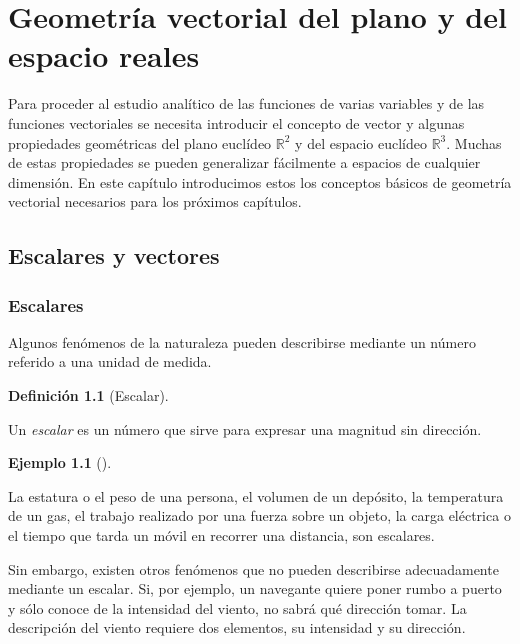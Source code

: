 \documentclass[
  a4paper,
]{scrreport}
\theoremstyle{definition}
\newtheorem{example}{Ejemplo}[chapter]
\theoremstyle{plain}
\theoremstyle{definition}
\newtheorem{definition}{Definición}[chapter]
\theoremstyle{definition}
\theoremstyle{plain}
\theoremstyle{plain}
\theoremstyle{remark}
\begin{document}

\chapter{Geometría vectorial del plano y del espacio
reales}\label{geometruxeda-vectorial-del-plano-y-del-espacio-reales}

Para proceder al estudio analítico de las funciones de varias variables
y de las funciones vectoriales se necesita introducir el concepto de
vector y algunas propiedades geométricas del plano euclídeo
\(\mathbb{R}^2\) y del espacio euclídeo \(\mathbb{R}^3\). Muchas de
estas propiedades se pueden generalizar fácilmente a espacios de
cualquier dimensión. En este capítulo introducimos estos los conceptos
básicos de geometría vectorial necesarios para los próximos capítulos.

\section{Escalares y vectores}\label{escalares-y-vectores}

\subsection{Escalares}\label{escalares}

Algunos fenómenos de la naturaleza pueden describirse mediante un número
referido a una unidad de medida.

\begin{definition}[Escalar]\protect\hypertarget{def-escalar}{}\label{def-escalar}

Un \emph{escalar} es un número que sirve para expresar una magnitud sin
dirección.

\end{definition}

\begin{example}[]\protect\hypertarget{exm-escalar}{}\label{exm-escalar}

La estatura o el peso de una persona, el volumen de un depósito, la
temperatura de un gas, el trabajo realizado por una fuerza sobre un
objeto, la carga eléctrica o el tiempo que tarda un móvil en recorrer
una distancia, son escalares.

\end{example}

Sin embargo, existen otros fenómenos que no pueden describirse
adecuadamente mediante un escalar. Si, por ejemplo, un navegante quiere
poner rumbo a puerto y sólo conoce de la intensidad del viento, no sabrá
qué dirección tomar. La descripción del viento requiere dos elementos,
su intensidad y su dirección.
\end{document}
